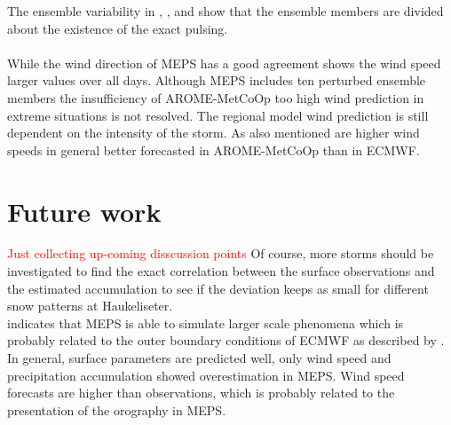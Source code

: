 The ensemble variability in , , and  show that the ensemble members are divided about the existence of the exact pulsing. 
\\
\\
While the wind direction of MEPS has a good agreement shows the wind speed larger values over all days. Although MEPS includes ten perturbed ensemble members the insufficiency of AROME-MetCoOp too high wind prediction in extreme situations is not resolved. The regional model wind prediction is still dependent on the intensity of the storm. As \cite{muller_arome-metcoop:_2017} also mentioned are higher wind speeds in general better forecasted in AROME-MetCoOp than in ECMWF. 
\section{Future work}
\textcolor{red}{Just collecting up-coming disscussion points}
Of course, more storms should be investigated to find the exact correlation between the surface observations and the estimated accumulation to see if the deviation keeps as small for different snow patterns at Haukeliseter. 
\\
 indicates that MEPS is able to simulate larger scale phenomena which is probably related to the outer boundary conditions of ECMWF as described by \citet{dahlgren_comparison_2013}.
In general, surface parameters are predicted well, only wind speed and precipitation accumulation showed overestimation in MEPS. Wind speed forecasts are higher than observations, which is probably related to the presentation of the orography in MEPS.
